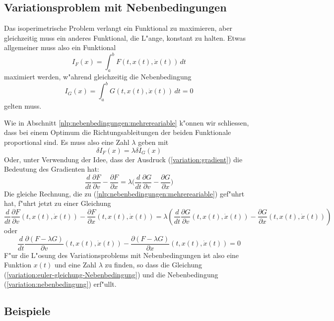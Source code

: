 \subsection{Variationsproblem mit Nebenbedingungen\label{variation:section-variationsproblem-nebenbedingungen}}
Das isoperimetrische Problem verlangt ein Funktional zu maximieren,
aber gleichzeitig muss ein anderes Funktional, die L"ange, konstant
zu halten. Etwas allgemeiner muss also ein Funktional
\[
I_F(x)=
\int_a^bF(t, x(t), \dot x(t))\,dt
\]
maximiert werden, w"ahrend gleichzeitig die Nebenbedingung
\begin{equation}
I_G(x)=
\int_a^b G(t, x(t), \dot x(t))\, dt = 0
\label{variation:nebenbedingung}
\end{equation}
gelten muss.

Wie in Abschnitt \ref{nlp:nebenbedingungen:mehrereariable} k"onnen wir
schliessen, dass bei einem Optimum die Richtungsableitungen
der beiden Funktionale proportional sind. Es muss also eine Zahl
$\lambda$ geben mit
\[
\delta I_F(x)=\lambda \delta I_G(x)
\]
Oder, unter Verwendung der Idee, dass der Ausdruck
(\ref{variation:gradient}) die Bedeutung des Gradienten hat:
\[
\frac{d}{dt}\frac{\partial F}{\partial v}-\frac{\partial F}{\partial x}
=
\lambda\biggl(
\frac{d}{dt}\frac{\partial G}{\partial v}-\frac{\partial G}{\partial x}
\biggr)
\]
Die gleiche Rechnung, die zu 
(\ref{nlp:nebenbedingungen:mehrereariable})
gef"uhrt hat, f"uhrt jetzt zu einer Gleichung
\begin{equation}
\frac{d}{dt}\frac{\partial F}{\partial v}(t,x(t),\dot x(t))
-
\frac{\partial F}{\partial x}(t,x(t),\dot x(t))
=
\lambda \left(
\frac{d}{dt}\frac{\partial G}{\partial v}(t,x(t),\dot x(t))
-
\frac{\partial G}{\partial x}(t,x(t),\dot x(t))
\right)
\end{equation}
oder 
\begin{equation}
\frac{d}{dt}\frac{\partial (F-\lambda G)}{\partial v}(t,x(t),\dot x(t))
-
\frac{\partial (F-\lambda G)}{\partial x}(t,x(t),\dot x(t))
=
0
\label{variation:euler-gleichung-Nebenbedingung}
\end{equation}
F"ur die L"osung des Variationsproblems mit Nebenbedingungen ist also
eine Funktion $x(t)$ und eine Zahl $\lambda$ zu finden, so
dass die Gleichung 
(\ref{variation:euler-gleichung-Nebenbedingung}) und
die Nebenbedingung
(\ref{variation:nebenbedingung})
erf"ullt.

\subsection{Beispiele}

